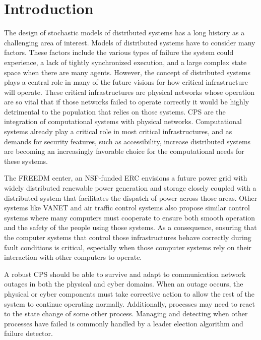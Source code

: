 \chapter{Introduction}

The design of stochastic models of distributed systems has a long history as a challenging area of interest.
Models of distributed systems have to consider many factors.
These factors include the various types of failure the system could experience, a lack of tightly synchronized execution, and a large complex state space when there are many agents\cite{DISTRIBUTED}\cite{distributed-challenges}. 
However, the concept of distributed systems plays a central role in many of the future visions for how critical infrastructure will operate.
These critical infrastructures are physical networks whose operation are so vital that if those networks failed to operate correctly it would be highly detrimental to the population that relies on those systems.
\ac{CPS} are the integration of computational systems with physical networks.
Computational systems already play a critical role in most critical infrastructures, and as demands for security features, such as accessibility, increase distributed systems are becoming an increasingly favorable choice for the computational needs for these systems\cite{SMARTGRIDBENEFITS}.

The \ac{FREEDM} center\cite{FREEDM}, an NSF-funded ERC envisions a future power grid with widely distributed renewable power generation and storage closely coupled with a distributed system that facilitates the dispatch of power across those areas.
Other systems like \ac{VANET}\cite{CARS1}\cite{CARS2}\cite{vanet-congestion} and air traffic control systems\cite{AIRTRAFFIC1}\cite{AIRTRAFFIC2} also propose similar control systems where many computers must cooperate to ensure both smooth operation and the safety of the people using those systems.
As a consequence, ensuring that the computer systems that control those infrastructures behave correctly during fault conditions is critical, especially when those computer systems rely on their interaction with other computers to operate.

A robust \ac{CPS} should be able to survive and adapt to communication network outages in both the physical and cyber domains.
When an outage occurs, the physical or cyber components must take corrective action to allow the rest of the system to continue operating normally.
Additionally, processes may need to react to the state change of some other process.
Managing and detecting when other processes have failed is commonly handled by a leader election algorithm and failure detector.

